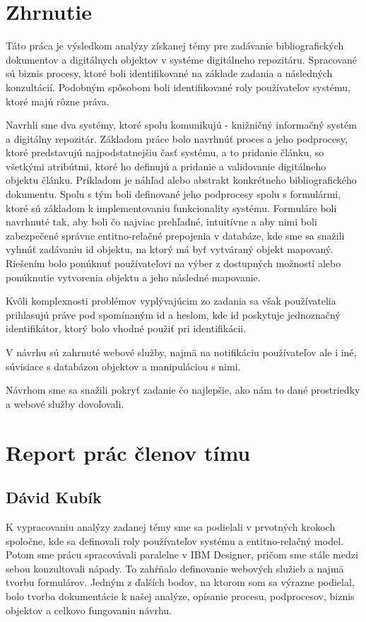 \documentclass[10pt,oneside,slovak,a4paper]{article}
\begin{document}
\newpage

\section{Zhrnutie}
Táto práca je výsledkom analýzy získanej témy pre zadávanie bibliografických dokumentov a digitálnych objektov v systéme digitálneho repozitáru. Spracované sú biznis procesy, ktoré boli identifikované na základe zadania a následných konzultácií. Podobným spôsobom boli identifikované roly používateľov systému, ktoré majú rôzne práva. 

Navrhli sme dva systémy, ktoré spolu komunikujú - knižničný informačný systém a digitálny repozitár. Základom práce bolo navrhnúť proces a jeho podprocesy, ktoré predstavujú najpodstatnejšiu časť systému, a to pridanie článku, so všetkými atribútmi, ktoré ho definujú a pridanie a validovanie digitálneho objektu článku. Príkladom je náhľad alebo abstrakt konkrétneho bibliografického dokumentu. Spolu s tým boli definované jeho podprocesy spolu s formulármi, ktoré sú základom k implementovaniu funkcionality systému. Formuláre boli navrhnuté tak, aby boli čo najviac prehľadné, intuitívne a aby nimi boli zabezpečené správne entitno-relačné prepojenia v databáze, kde sme sa snažili vyhnúť zadávaniu id objektu, na ktorý má byť vytváraný objekt mapovaný. Riešením bolo ponúknuť používateľovi na výber z dostupných možností alebo ponúknutie vytvorenia objektu a jeho následné mapovanie.

Kvôli komplexnosti problémov vyplývajúcim zo zadania sa však používatelia prihlasujú práve pod spomínaným id a heslom, kde id poskytuje jednoznačný identifikátor, ktorý bolo vhodné použiť pri identifikácii.

V návrhu sú zahrnuté webové služby, najmä na notifikáciu používateľov ale i iné, súvisiace s databázou objektov a manipuláciou s nimi.

Návrhom sme sa snažili pokryť zadanie čo najlepšie, ako nám to dané prostriedky a webové služby dovoľovali.

\section{Report prác členov tímu}
\subsection{Dávid Kubík}
K vypracovaniu analýzy zadanej témy sme sa podielali v prvotných krokoch spoločne, kde sa definovali roly používateľov systému a entitno-relačný model. Potom sme prácu spracovávali paralelne v IBM Designer, pričom sme stále medzi sebou konzultovali nápady.  To zahŕňalo definovanie webových služieb a najmä tvorbu formulárov. Jedným z ďalších bodov, na ktorom som sa výrazne podielal, bolo tvorba dokumentácie k našej analýze, opísanie procesu, podprocesov, biznis objektov a celkovo fungovaniu návrhu.
\end{document}
